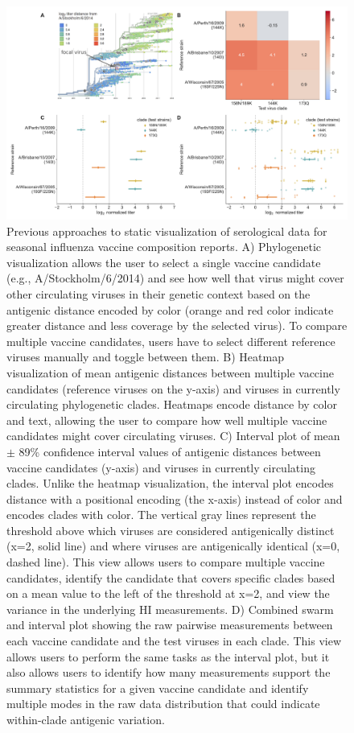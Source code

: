 \documentclass[utf8]{FrontiersinHarvard} %
\begin{document}
\begin{figure}[h!]
  \begin{center}
    \includegraphics[width=\textwidth]{figures/figure-1-static-titer-visualizations}
  \end{center}
  \caption{
    Previous approaches to static visualization of serological data for seasonal influenza vaccine composition reports.
A) Phylogenetic visualization \citep{NeherBedford2018} allows the user to select a single vaccine candidate (e.g., A/Stockholm/6/2014) and see how well that virus might cover other circulating viruses in their genetic context based on the antigenic distance encoded by color (orange and red color indicate greater distance and less coverage by the selected virus).
To compare multiple vaccine candidates, users have to select different reference viruses manually and toggle between them.
B) Heatmap visualization of mean antigenic distances between multiple vaccine candidates (reference viruses on the y-axis) and viruses in currently circulating phylogenetic clades.
Heatmaps encode distance by color and text, allowing the user to compare how well multiple vaccine candidates might cover circulating viruses.
C) Interval plot of mean $\pm$ 89\% confidence interval values of antigenic distances between vaccine candidates (y-axis) and viruses in currently circulating clades.
Unlike the heatmap visualization, the interval plot encodes distance with a positional encoding (the x-axis) instead of color and encodes clades with color.
The vertical gray lines represent the threshold above which viruses are considered antigenically distinct (x=2, solid line) and where viruses are antigenically identical (x=0, dashed line).
This view allows users to compare multiple vaccine candidates, identify the candidate that covers specific clades based on a mean value to the left of the threshold at x=2, and view the variance in the underlying HI measurements.
D) Combined swarm and interval plot showing the raw pairwise measurements between each vaccine candidate and the test viruses in each clade.
This view allows users to perform the same tasks as the interval plot, but it also allows users to identify how many measurements support the summary statistics for a given vaccine candidate and identify multiple modes in the raw data distribution that could indicate within-clade antigenic variation.
}\label{fig:1}
\end{figure}
\end{document}
